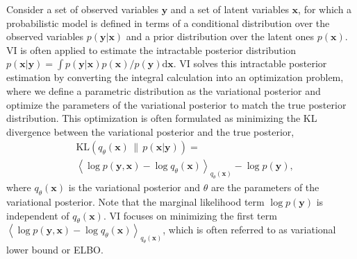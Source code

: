 \documentclass[twoside]{article}
\newcommand{\yV}{\mathbf{y}}
\newcommand{\xV}{\mathbf{x}}
\newcommand{\bound}{\mathcal{L}}
\newcommand{\KL}[2]{\text{KL}\left( #1\,\|\,#2 \right)}
\newcommand{\expectationDist}[2]{\left\langle #1 \right\rangle _{#2}}
\newcommand{\diff}{\text{d}}
\begin{document}
Consider a set of observed variables $\yV$ and a set of latent variables $\xV$, for which a probabilistic model is defined in terms of a conditional distribution over the observed variables $p(\yV|\xV)$ and a prior distribution over the latent ones $p(\xV)$. VI is often applied to estimate the intractable posterior distribution $p(\xV|\yV)=\int p(\yV|\xV)p(\xV)/p(\yV)\diff \xV$. VI solves this intractable posterior estimation by converting the integral calculation into an optimization problem, where we define a parametric distribution as the variational posterior and optimize the parameters of the variational posterior to match the true posterior distribution. This optimization is often formulated as minimizing the KL divergence between the variational posterior and the true posterior,
\begin{equation}
\begin{split}
&\KL{q_\theta(\xV)}{ p(\xV|\yV)} = \\
& \expectationDist{\log p(\yV, \xV)-\log q_\theta(\xV)}{q_\theta(\xV)} - \log p(\yV),
\end{split}
\end{equation}
where $q_\theta(\xV)$ is the variational posterior and $\theta$ are the parameters of the variational posterior. Note that the marginal likelihood term $\log p(\yV)$ is independent of $q_\theta(\xV)$. VI focuses on minimizing the first term $\expectationDist{\log p(\yV, \xV)-\log q_\theta(\xV)}{q_\theta(\xV)}$, which is often referred to as variational lower bound or ELBO.

\end{document}
